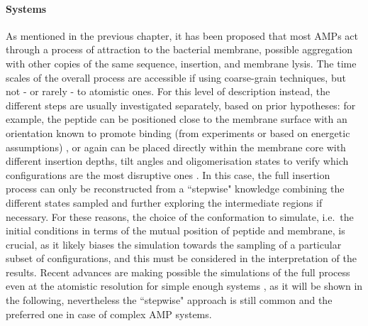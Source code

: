 \paragraph{Systems} As mentioned in the previous chapter, it has been proposed that most AMPs act through a process of attraction to the bacterial membrane, possible aggregation with other copies of the same sequence, insertion, and membrane lysis. The time scales of the overall process are accessible if using coarse-grain techniques, but not - or rarely - to atomistic ones.
%
For this level of description instead, the different steps are usually investigated separately, based on prior hypotheses: for example, the peptide can be positioned close to the membrane surface with an orientation known to promote binding (from experiments or based on energetic assumptions) \cite{Wang2012}, or again can be placed directly within the membrane core with different insertion depths, tilt angles and oligomerisation states to verify which configurations are the most disruptive ones \cite{Lipkin2017}. In this case, the full insertion process can only be reconstructed from a ``stepwise" knowledge combining the different states sampled and further exploring the intermediate regions if necessary.
%
For these reasons, the choice of the conformation to simulate, i.e.\ the initial conditions in terms of the mutual position of peptide and membrane, is crucial, as it likely biases the simulation towards the sampling of a particular subset of configurations, and this must be considered in the interpretation of the results. Recent advances are making possible the simulations of the full process even at the atomistic resolution for simple enough systems \cite{Ulmschneider2017,Sun2015}, as it will be shown in the following, nevertheless the ``stepwise" approach is still common and the preferred one in case of complex AMP systems.

